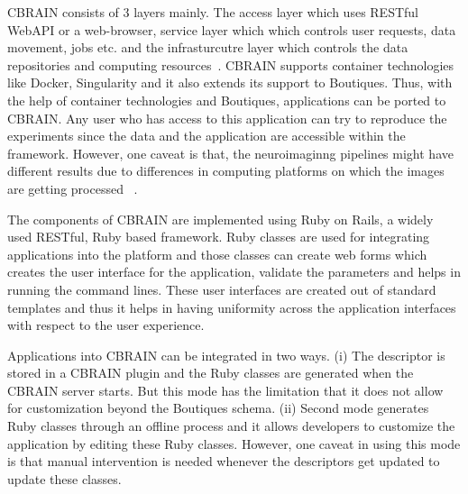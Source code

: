 CBRAIN consists of 3 layers mainly. The access layer which uses RESTful WebAPI or a web-browser, service layer which which controls user requests, data movement, jobs etc. and the infrasturcutre layer which controls the data repositories and computing resources~\cite{DBLP:journals/fini/DasGRSPMSRSKMKR17}.
CBRAIN supports container technologies like Docker, Singularity and it also extends its support to Boutiques. Thus, with the help of container technologies and Boutiques, applications can be ported to CBRAIN. Any user who has access to this application can try to reproduce the experiments since the data and the application are accessible within the framework. However, one caveat is that, the neuroimaginng pipelines might have different results due to differences in computing platforms on which the images are getting processed ~\cite{10.3389/conf.fninf.2014.18.00076}.

The components of CBRAIN are implemented using Ruby on Rails, a widely used RESTful, Ruby based framework. Ruby classes are used for integrating applications into the platform and those classes can create web forms which creates the user interface for the application, validate the parameters and helps in running the command lines. These user interfaces are created out of standard templates and thus it helps in having uniformity across the application interfaces with respect to the user experience.

Applications into CBRAIN can be integrated in two ways. (i) The descriptor is stored in a CBRAIN plugin and the Ruby classes are generated when the CBRAIN server starts. But this mode has the limitation that it does not allow for customization beyond the Boutiques schema. (ii) Second mode generates Ruby classes through an offline process and it allows developers to customize the application by editing these Ruby classes. However, one caveat in using this mode is that manual intervention is needed whenever the descriptors get updated to update these classes.

